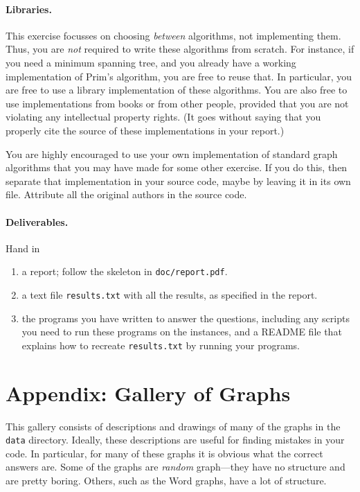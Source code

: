 \documentclass{tufte-handout}
\begin{document}
\paragraph{Libraries.}
This exercise focusses on choosing \emph{between} algorithms, not implementing them.
Thus, you are \emph{not} required to write these algorithms from scratch.
For instance, if you need a minimum spanning tree, and you already have a working implementation of Prim’s algorithm, you are free to reuse that.
In particular, you are free to use a library implementation of these algorithms. 
You are also free to use implementations from books or from other people, provided that you are not violating any intellectual property rights.
(It goes without saying that you properly cite the source of these implementations in your report.)

You are highly encouraged to use your own implementation of standard graph algorithms that you may have made for some other exercise.
If you do this, then separate that implementation in your source code, maybe by leaving it in its own file. 
Attribute all the original authors in the source code.

\paragraph{Deliverables.}
Hand in 
\begin{enumerate}
  \item a report; follow the skeleton in {\tt doc/report.pdf}. 
  \item a text file {\tt results.txt} with all the results, as specified in the report.
  \item the programs you have written to answer the questions, including any scripts you need to run these programs on the instances, and a README file that explains how to recreate {\tt results.txt} by running your programs.
\end{enumerate}

\newpage
\section{Appendix: Gallery of Graphs}

This gallery consists of descriptions and drawings of many of the graphs in the {\tt data} directory.
Ideally, these descriptions are useful for finding mistakes in your code.
In particular, for many of these graphs it is obvious what the correct answers are.
Some of the graphs are \emph{random} graph---they have no structure and are pretty boring.
Others, such as the Word graphs, have a lot of structure.
\end{document}
